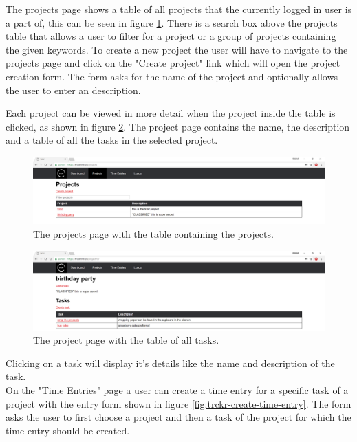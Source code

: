 \documentclass[bibliography=totoc, listof=totocnumbered]{scrartcl}
\begin{document}
The projects page shows a table of all projects that the currently logged in
user is a part of, this can be seen in figure \ref{fig:trckr-projects-table}. There is a
search box above the projects table that allows a user to filter for a project or
a group of projects containing the given keywords. To create a new project the
user will have to navigate to the projects page and click on the "Create
project" link which will open the project creation form. %
The form asks for the name of the project and optionally allows the user to enter an
description.

Each project can be viewed in more detail when the project inside the table is
clicked, as shown in figure \ref{fig:trckr-project-page}. The project page
contains the name, the description and a table of all the tasks in the selected
project.

\begin{figure}[h]
    \includegraphics[width=\textwidth]{trckr-projects-table}
    \caption{The projects page with the table containing the projects.}
    \label{fig:trckr-projects-table}
\end{figure}

\begin{figure}[h]
    \includegraphics[width=\textwidth]{trckr-project-page}
    \caption{The project page with the table of all tasks.}
    \label{fig:trckr-project-page}
\end{figure}

Clicking on a task will display it's details like the name and description of
the task. \\
On the "Time Entries" page a user can create a time entry for a
specific task of a project with the entry form shown in figure
\ref{fig:trckr-create-time-entry}. The form asks the user to first choose a
project and then a task of the project for which the time entry should be
created.
\end{document}
